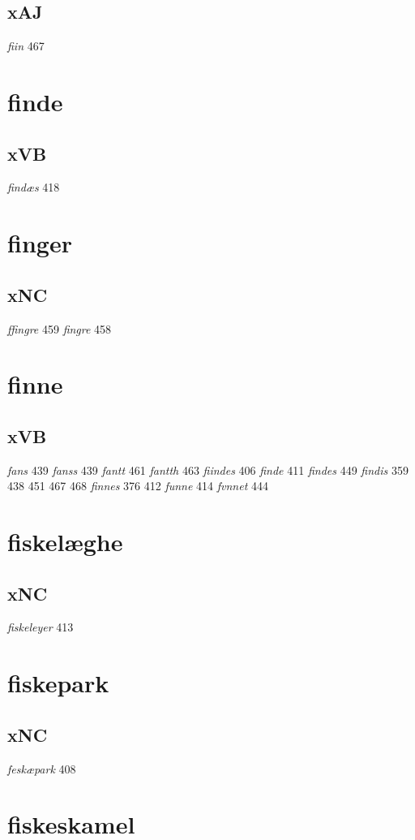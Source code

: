 \documentclass[a4paper,twocolumn]{article}
\begin{document}
\subsection{xAJ}
\label{sec:org15f8623}
\emph{fiin} 467 
\section{finde}
\label{sec:org69042a0}
\subsection{xVB}
\label{sec:org90e8735}
\emph{findæs} 418 
\section{finger}
\label{sec:orgbaf9037}
\subsection{xNC}
\label{sec:orgc1b619a}
\emph{ffingre} 459 \emph{fingre} 458 
\section{finne}
\label{sec:org96d0de1}
\subsection{xVB}
\label{sec:orgd74648f}
\emph{fans} 439 \emph{fanss} 439 \emph{fantt} 461 \emph{fantth} 463 \emph{fiindes} 406 \emph{finde} 411 \emph{findes} 449 \emph{findis} 359 438 451 467 468 \emph{finnes} 376 412 \emph{funne} 414 \emph{fvnnet} 444 
\section{fiskelæghe}
\label{sec:org7ac344b}
\subsection{xNC}
\label{sec:org8eedc90}
\emph{fiskeleyer} 413 
\section{fiskepark}
\label{sec:orge54900a}
\subsection{xNC}
\label{sec:org671617d}
\emph{feskæpark} 408 
\section{fiskeskamel}
\label{sec:org535ecf0}
\end{document}
